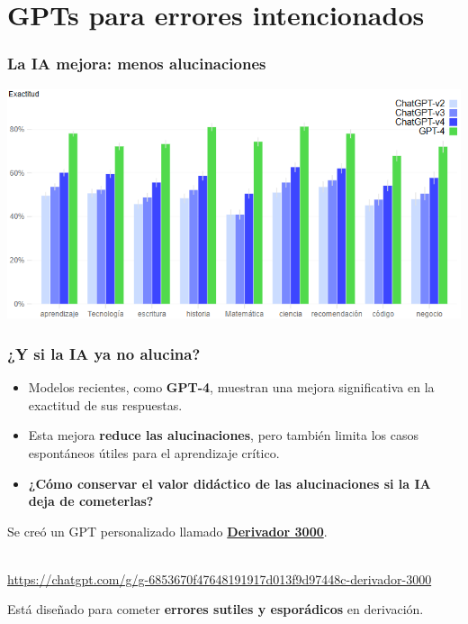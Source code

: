 \section{GPTs para errores intencionados}

\begin{frame}
    \frametitle{La IA mejora: menos alucinaciones}

    \centering
    \includegraphics[width=0.85\linewidth]{Figuras/Fig10.png}
\end{frame}


\begin{frame}
    \frametitle{¿Y si la IA ya no alucina?}

    \begin{itemize}
         \item Modelos recientes, como \textbf{GPT-4}, muestran una mejora significativa en la exactitud de sus respuestas.
        \item Esta mejora \textbf{reduce las alucinaciones}, pero también limita los casos espontáneos útiles para el aprendizaje crítico.
        \item \textbf{¿Cómo conservar el valor didáctico de las alucinaciones si la IA deja de cometerlas?}
    \end{itemize}
\end{frame}


\begin{frame}

     Se creó un GPT personalizado llamado  \href{https://chatgpt.com/g/g-6853670f47648191917d013f9d97448c-derivador-3000}{\textbf{Derivador 3000}}.

    \centering
    \\\footnotesize
    \url{https://chatgpt.com/g/g-6853670f47648191917d013f9d97448c-derivador-3000}
\end{frame}

\begin{frame}


    Está diseñado para cometer \textbf{errores sutiles y esporádicos} en derivación.


    \centering
\end{frame}

